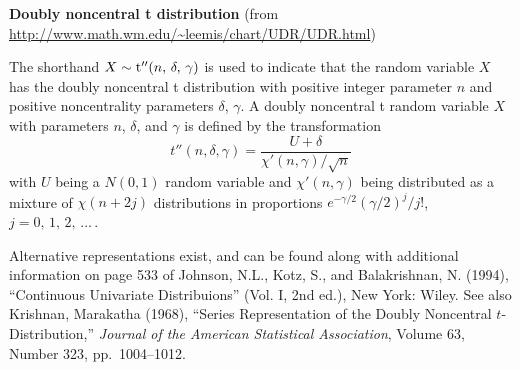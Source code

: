 \documentclass[12pt,fullpage]{article}
\begin{document}
\noindent
{\bf Doubly noncentral t distribution} (from \color{blue}\url{http://www.math.wm.edu/~leemis/chart/UDR/UDR.html}\color{black})

\noindent
The shorthand $X \sim {\rm t''}(n,\, \delta,\, \gamma)$ is used to indicate that the
random variable $X$ has the doubly noncentral t distribution with positive integer parameter $n$ and positive noncentrality parameters $\delta$, $\gamma$.
A doubly noncentral t random variable $X$ with parameters $n$, $\delta$, and $\gamma$ is defined by the transformation
$$
t''(n, \delta, \gamma) = \frac{U + \delta}{\chi'(n, \gamma)/\sqrt{n}}
$$
with $U$ being a $N(0,1)$ random variable and $\chi'(n, \gamma)$ being distributed as a mixture of $\chi (n + 2j)$ distributions
in proportions $e^{-\gamma/2}(\gamma/2)^j/j!$, $j = 0, \, 1, \, 2, \, \ldots \,$.

\vspace{0.1in}
\noindent
Alternative representations exist, and can be found along with additional information
on page 533 of Johnson, N.L., Kotz, S., and Balakrishnan, N. (1994),
``Continuous Univariate Distribuions'' (Vol. I, 2nd ed.), New York: Wiley.
See also
Krishnan, Marakatha (1968), ``Series Representation of the Doubly Noncentral $t$-Distribution,'' {\it Journal of the American Statistical Association},
Volume 63, Number 323, pp.\ 1004--1012.

\vspace{0.1in}

\noindent
\end{document}
